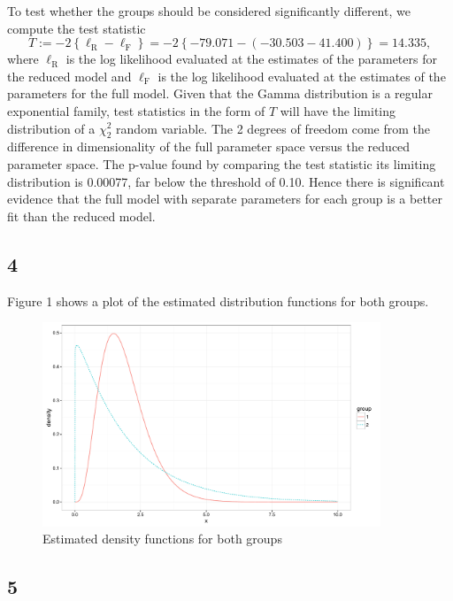 \documentclass[12pt]{article}
\begin{document}
To test whether the groups should be considered significantly different, we compute the test statistic
\[
  T := -2\left\{ \ell_{\text{R}} - \ell_{\text{F}} \right\} = -2\left\{ -79.071 - (-30.503 - 41.400) \right\} = 14.335,
\]
where $\ell_{\text{R}}$ is the log likelihood evaluated at the estimates of the parameters for the reduced model and $\ell_{\text{F}}$ is the log likelihood evaluated
at the estimates of the parameters for the full model. Given that the Gamma distribution is a regular exponential family, test statistics in the form
of $T$ will have the limiting distribution of a $\chi_{2}^{2}$ random variable. The 2 degrees of freedom come from the difference in dimensionality of
the full parameter space versus the reduced parameter space. The p-value found by comparing the test statistic its limiting distribution is 0.00077,
far below the threshold of 0.10. Hence there is significant evidence that the full model with separate parameters for each group is a better fit than
the reduced model.


\subsection*{4}

Figure 1 shows a plot of the estimated distribution functions for both groups.

\begin{figure}[!h]
  \caption{Estimated density functions for both groups}
  \centering
  \includegraphics[width=0.9\textwidth]{./figures/hw02_group.pdf}
\end{figure}


\subsection*{5}
\end{document}
